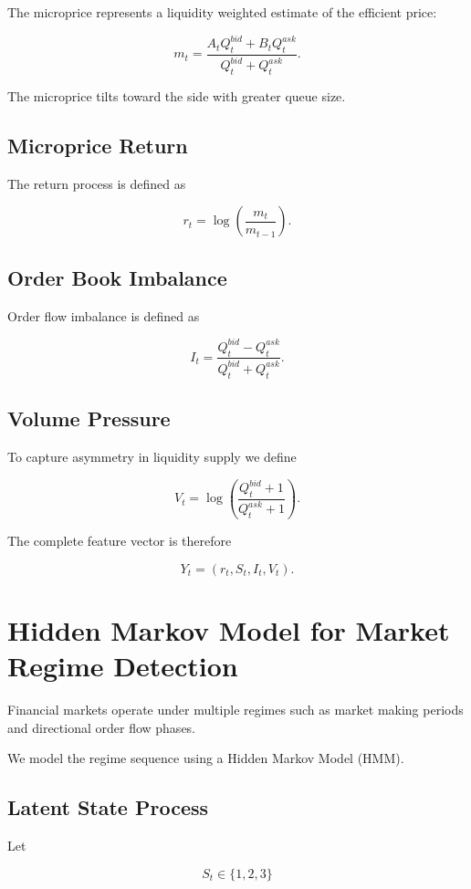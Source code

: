 \documentclass[11pt]{article}
\begin{document}
The microprice represents a liquidity weighted estimate of the efficient price:

\[
m_t =
\frac{A_t Q_t^{bid} + B_t Q_t^{ask}}
     {Q_t^{bid}+Q_t^{ask}}.
\]

The microprice tilts toward the side with greater queue size.

\subsection{Microprice Return}

The return process is defined as

\[
r_t = \log\left(\frac{m_t}{m_{t-1}}\right).
\]

\subsection{Order Book Imbalance}

Order flow imbalance is defined as

\[
I_t =
\frac{Q_t^{bid} - Q_t^{ask}}
     {Q_t^{bid}+Q_t^{ask}}.
\]

\subsection{Volume Pressure}

To capture asymmetry in liquidity supply we define

\[
V_t = \log\left(\frac{Q_t^{bid}+1}{Q_t^{ask}+1}\right).
\]

The complete feature vector is therefore

\[
Y_t =
(r_t,S_t,I_t,V_t).
\]

\section{Hidden Markov Model for Market Regime Detection}

Financial markets operate under multiple regimes such as market making periods and directional order flow phases.

We model the regime sequence using a Hidden Markov Model (HMM).

\subsection{Latent State Process}

Let

\[
S_t \in \{1,2,3\}
\]
\end{document}
